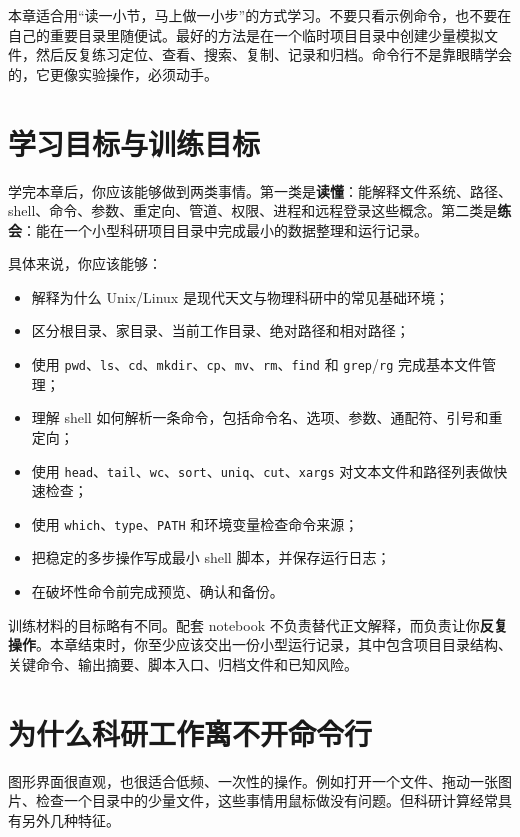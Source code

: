 本章适合用“读一小节，马上做一小步”的方式学习。不要只看示例命令，也不要在自己的重要目录里随便试。最好的方法是在一个临时项目目录中创建少量模拟文件，然后反复练习定位、查看、搜索、复制、记录和归档。命令行不是靠眼睛学会的，它更像实验操作，必须动手。

\section{学习目标与训练目标}

学完本章后，你应该能够做到两类事情。第一类是\textbf{读懂}：能解释文件系统、路径、shell、命令、参数、重定向、管道、权限、进程和远程登录这些概念。第二类是\textbf{练会}：能在一个小型科研项目目录中完成最小的数据整理和运行记录。

具体来说，你应该能够：

\begin{itemize}
    \item 解释为什么 Unix/Linux 是现代天文与物理科研中的常见基础环境；
    \item 区分根目录、家目录、当前工作目录、绝对路径和相对路径；
    \item 使用 \texttt{pwd}、\texttt{ls}、\texttt{cd}、\texttt{mkdir}、\texttt{cp}、\texttt{mv}、\texttt{rm}、\texttt{find} 和 \texttt{grep}/\texttt{rg} 完成基本文件管理；
    \item 理解 shell 如何解析一条命令，包括命令名、选项、参数、通配符、引号和重定向；
    \item 使用 \texttt{head}、\texttt{tail}、\texttt{wc}、\texttt{sort}、\texttt{uniq}、\texttt{cut}、\texttt{xargs} 对文本文件和路径列表做快速检查；
    \item 使用 \texttt{which}、\texttt{type}、\texttt{PATH} 和环境变量检查命令来源；
    \item 把稳定的多步操作写成最小 shell 脚本，并保存运行日志；
    \item 在破坏性命令前完成预览、确认和备份。
\end{itemize}

训练材料的目标略有不同。配套 notebook 不负责替代正文解释，而负责让你\textbf{反复操作}。本章结束时，你至少应该交出一份小型运行记录，其中包含项目目录结构、关键命令、输出摘要、脚本入口、归档文件和已知风险。

\section{为什么科研工作离不开命令行}

图形界面很直观，也很适合低频、一次性的操作。例如打开一个文件、拖动一张图片、检查一个目录中的少量文件，这些事情用鼠标做没有问题。但科研计算经常具有另外几种特征。


